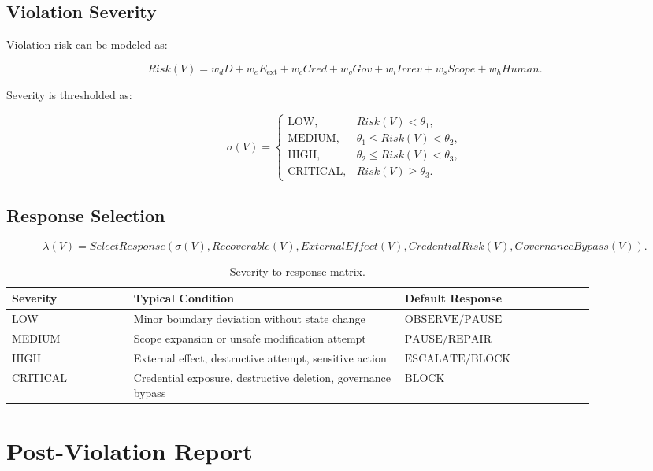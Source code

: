 \documentclass[11pt,a4paper]{article}
\newcommand{\REPAIR}{\mathrm{REPAIR}}
\newcommand{\BLOCK}{\mathrm{BLOCK}}
\newcommand{\OBSERVE}{\mathrm{OBSERVE}}
\newcommand{\PAUSE}{\mathrm{PAUSE}}
\newcommand{\ESCALATE}{\mathrm{ESCALATE}}
\begin{document}
\subsection{Violation Severity}

Violation risk can be modeled as:

\[
Risk(V)
=
w_dD
+
w_eE_{\mathrm{ext}}
+
w_cCred
+
w_gGov
+
w_iIrrev
+
w_sScope
+
w_hHuman.
\]

Severity is thresholded as:

\[
\sigma(V)=
\begin{cases}
\mathrm{LOW}, & Risk(V)<\theta_1,\\
\mathrm{MEDIUM}, & \theta_1\leq Risk(V)<\theta_2,\\
\mathrm{HIGH}, & \theta_2\leq Risk(V)<\theta_3,\\
\mathrm{CRITICAL}, & Risk(V)\geq \theta_3.
\end{cases}
\]

\subsection{Response Selection}

\[
\lambda(V)
=
SelectResponse
\left(
\sigma(V),
Recoverable(V),
ExternalEffect(V),
CredentialRisk(V),
GovernanceBypass(V)
\right).
\]

\begin{table}[H]
\centering
\caption{Severity-to-response matrix.}
\begin{tabular}{p{0.18\linewidth} p{0.40\linewidth} p{0.28\linewidth}}
\toprule
\textbf{Severity} & \textbf{Typical Condition} & \textbf{Default Response} \\
\midrule
LOW & Minor boundary deviation without state change & \(\OBSERVE / \PAUSE\) \\
MEDIUM & Scope expansion or unsafe modification attempt & \(\PAUSE / \REPAIR\) \\
HIGH & External effect, destructive attempt, sensitive action & \(\ESCALATE / \BLOCK\) \\
CRITICAL & Credential exposure, destructive deletion, governance bypass & \(\BLOCK\) \\
\bottomrule
\end{tabular}
\end{table}

\section{Post-Violation Report}
\end{document}
